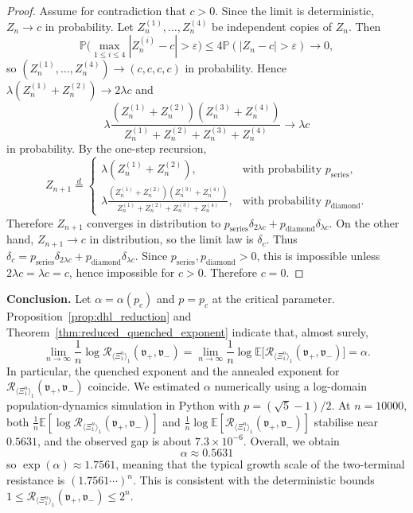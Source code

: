 \documentclass{article}
\theoremstyle{plain}
\theoremstyle{definition}
\newcommand{\Reff}{\mathscr{R}}
\begin{document}
\begin{proof}
Assume for contradiction that \(c>0\).
Since the limit is deterministic, \(Z_n\to c\) in probability.
Let \(Z_n^{(1)},\dots,Z_n^{(4)}\) be independent copies of \(Z_n\).
Then
\[
\mathbb P\Big(\max_{1\le i\le 4}|Z_n^{(i)}-c|>\varepsilon\Big)\le 4\mathbb P(|Z_n-c|>\varepsilon)\to 0,
\]
so \((Z_n^{(1)},\dots,Z_n^{(4)})\to (c,c,c,c)\) in probability.
Hence
$
\lambda(Z_n^{(1)}+Z_n^{(2)})\to 2\lambda c
$
and
\[
\lambda\frac{(Z_n^{(1)}+Z_n^{(2)})(Z_n^{(3)}+Z_n^{(4)})}{Z_n^{(1)}+Z_n^{(2)}+Z_n^{(3)}+Z_n^{(4)}}\to \lambda c
\]
in probability.
By the one-step recursion,
\[
Z_{n+1}\stackrel d=
\begin{cases}
\lambda(Z_n^{(1)}+Z_n^{(2)}), & \text{with probability } p_{\mathrm{series}},\\
\lambda\frac{(Z_n^{(1)}+Z_n^{(2)})(Z_n^{(3)}+Z_n^{(4)})}{Z_n^{(1)}+Z_n^{(2)}+Z_n^{(3)}+Z_n^{(4)}}, & \text{with probability } p_{\mathrm{diamond}}.
\end{cases}
\]
Therefore \(Z_{n+1}\) converges in distribution to
$
p_{\mathrm{series}}\delta_{2\lambda c}+p_{\mathrm{diamond}}\delta_{\lambda c}.
$
On the other hand, \(Z_{n+1}\to c\) in distribution, so the limit law is \(\delta_c\).
Thus
$
\delta_c=p_{\mathrm{series}}\delta_{2\lambda c}+p_{\mathrm{diamond}}\delta_{\lambda c}.
$
Since \(p_{\mathrm{series}},p_{\mathrm{diamond}}>0\), this is impossible unless \(2\lambda c=\lambda c=c\), hence impossible for \(c>0\).
Therefore \(c=0\).
\end{proof}





\textbf{Conclusion.} 
Let $\alpha=\alpha(p_c)$ and $p=p_c$ at the critical parameter.
Proposition~\ref{prop:dhl_reduction} and Theorem~\ref{thm:reduced_quenched_exponent} indicate that, almost surely, \[ \lim_{n\to\infty}\frac{1}{n}\log \Reff_{\langle \Xi_1^n \rangle_1}(\mathfrak v_+,\mathfrak v_-) = \lim_{n\to\infty}\frac{1}{n}\log \mathbb E\big[\Reff_{\langle \Xi_1^n \rangle_1}(\mathfrak v_+,\mathfrak v_-)\big] = \alpha. \] 
In particular, the quenched exponent and the annealed exponent for $\Reff_{\langle \Xi_1^n \rangle_1}(\mathfrak v_+,\mathfrak v_-)$ coincide. We estimated $\alpha$ numerically using a log-domain population-dynamics simulation in Python with $p=(\sqrt 5-1)/2$. 
At $n=10000$, both $\frac{1}{n}\mathbb E[\log \Reff_{\langle \Xi_1^n \rangle_1}(\mathfrak v_+,\mathfrak v_-)]$ and $\frac{1}{n}\log \mathbb E[\Reff_{\langle \Xi_1^n \rangle_1}(\mathfrak v_+,\mathfrak v_-)]$ stabilise near $0.5631$, and the observed gap is about $7.3\times 10^{-6}$.
Overall, we obtain \[ \alpha\approx 0.5631 \] so $\exp(\alpha)\approx 1.7561$, meaning that the typical growth scale of the two-terminal resistance is $(1.7561\cdots)^n$. 
This is consistent with the deterministic bounds $1\le \Reff_{\langle \Xi_1^n \rangle_1}(\mathfrak v_+,\mathfrak v_-)\le 2^n$. 
\end{document}
